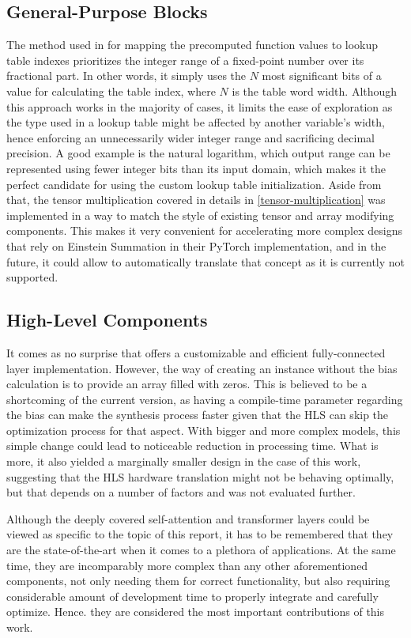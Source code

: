 \subsection{General-Purpose Blocks}\label{hls4ml-general-purpose}
The method used in \hlsml for mapping the precomputed function values to lookup table indexes prioritizes the integer range of a fixed-point number over its fractional part. In other words, it simply uses the \(N\) most significant bits of a value for calculating the table index, where \(N\) is the table word width. Although this approach works in the majority of cases, it limits the ease of exploration as the type used in a lookup table might be affected by another variable's width, hence enforcing an unnecessarily wider integer range and sacrificing decimal precision. A good example is the natural logarithm, which output range can be represented using fewer integer bits than its input domain, which makes it the perfect candidate for using the custom lookup table initialization. Aside from that, the tensor multiplication covered in details in \cref{tensor-multiplication} was implemented in a way to match the style of existing tensor and array modifying components. This makes it very convenient for accelerating more complex designs that rely on Einstein Summation in their PyTorch implementation, and in the future, it could allow \hlsml to automatically translate that concept as it is currently not supported.

\subsection{High-Level Components}
It comes as no surprise that \hlsml offers a customizable and efficient fully-connected layer implementation. However, the way of creating an instance without the bias calculation is to provide an array filled with zeros. This is believed to be a shortcoming of the current version, as having a compile-time parameter regarding the bias can make the synthesis process faster given that the HLS can skip the optimization process for that aspect. With bigger and more complex models, this simple change could lead to noticeable reduction in processing time. What is more, it also yielded a marginally smaller design in the case of this work, suggesting that the HLS hardware translation might not be behaving optimally, but that depends on a number of factors and was not evaluated further.

Although the deeply covered self-attention and transformer layers could be viewed as specific to the topic of this report, it has to be remembered that they are the state-of-the-art when it comes to a plethora of applications. At the same time, they are incomparably more complex than any other aforementioned components, not only needing them for correct functionality, but also requiring considerable amount of development time to properly integrate and carefully optimize. Hence. they are considered the most important \hlsml contributions of this work.